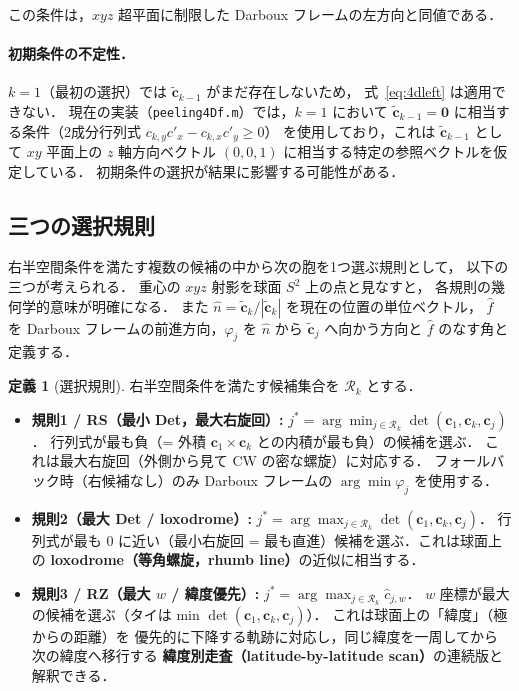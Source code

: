 \documentclass[12pt,a4paper]{article}
\theoremstyle{definition}
\newtheorem{defn}{定義}[section]
\begin{document}
この条件は，$xyz$ 超平面に制限した Darboux フレームの左方向と同値である．

\paragraph{初期条件の不定性．}
$k=1$（最初の選択）では $\tilde{\mathbf{c}}_{k-1}$ がまだ存在しないため，
式~\eqref{eq:4dleft} は適用できない．
現在の実装（\texttt{peeling4Df.m}）では，$k=1$ において
$\tilde{\mathbf{c}}_{k-1} = \mathbf{0}$ に相当する条件（2成分行列式 $c_{k,y} c'_x - c_{k,x} c'_y \ge 0$）
を使用しており，これは $\tilde{\mathbf{c}}_{k-1}$ として $xy$ 平面上の
$z$ 軸方向ベクトル $(0,0,1)$ に相当する特定の参照ベクトルを仮定している．
初期条件の選択が結果に影響する可能性がある．

\subsection{三つの選択規則}

右半空間条件を満たす複数の候補の中から次の胞を1つ選ぶ規則として，
以下の三つが考えられる．
重心の $xyz$ 射影を球面 $S^2$ 上の点と見なすと，
各規則の幾何学的意味が明確になる．
また $\hat{n} = \tilde{\mathbf{c}}_k / |\tilde{\mathbf{c}}_k|$ を現在の位置の単位ベクトル，
$\hat{f}$ を Darboux フレームの前進方向，$\varphi_j$ を
$\hat{n}$ から $\tilde{\mathbf{c}}_j$ へ向かう方向と $\hat{f}$ のなす角と定義する．

\begin{defn}[選択規則]
  \label{defn:rules}
  右半空間条件を満たす候補集合を $\mathcal{R}_k$ とする．
  \begin{itemize}
    \item \textbf{規則1 / RS（最小 Det，最大右旋回）:}
      $\displaystyle j^* = \arg\min_{j \in \mathcal{R}_k} \det(\mathbf{c}_1, \mathbf{c}_k, \mathbf{c}_j)$．
      行列式が最も負（= 外積 $\mathbf{c}_1 \times \mathbf{c}_k$ との内積が最も負）の候補を選ぶ．
      これは最大右旋回（外側から見て CW の密な螺旋）に対応する．
      フォールバック時（右候補なし）のみ Darboux フレームの $\arg\min \varphi_j$ を使用する．
    \item \textbf{規則2（最大 Det / loxodrome）:}
      $\displaystyle j^* = \arg\max_{j \in \mathcal{R}_k} \det(\mathbf{c}_1, \mathbf{c}_k, \mathbf{c}_j)$．
      行列式が最も 0 に近い（最小右旋回 = 最も直進）候補を選ぶ．これは球面上の
      \textbf{loxodrome（等角螺旋，rhumb line）}の近似に相当する．
    \item \textbf{規則3 / RZ（最大 $w$ / 緯度優先）:}
      $\displaystyle j^* = \arg\max_{j \in \mathcal{R}_k} \hat{c}_{j,w}$．
      $w$ 座標が最大の候補を選ぶ（タイは min $\det(\mathbf{c}_1,\mathbf{c}_k,\mathbf{c}_j)$）．
      これは球面上の「緯度」（極からの距離）を
      優先的に下降する軌跡に対応し，同じ緯度を一周してから次の緯度へ移行する
      \textbf{緯度別走査（latitude-by-latitude scan）}の連続版と解釈できる．
  \end{itemize}
\end{defn}
\end{document}
